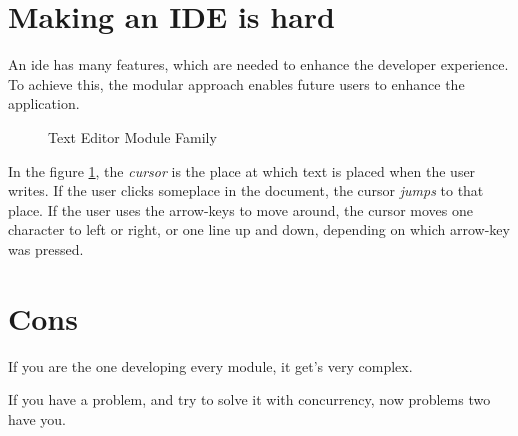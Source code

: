 \section{Making an IDE is hard}

An \gls{ide} has many features, which are needed to enhance the developer
experience. To achieve this, the modular approach enables future users to
enhance the application.

\begin{figure}
  \centering
  
  \caption{Text Editor Module Family}
  \label{fig:extendedModuleFamily}
\end{figure}

In the figure \ref{fig:extendedModuleFamily}, the \textit{cursor} is the place
at which text is placed when the user writes. If the user clicks someplace in
the document, the cursor \textit{jumps} to that place. If the user uses the
arrow-keys to move around, the cursor moves one character to left or right, or
one line up and down, depending on which arrow-key was pressed.

\section{Cons}

If you are the one developing every module, it get's very complex.

If you have a problem, and try to solve it with concurrency, now problems two
have you.

